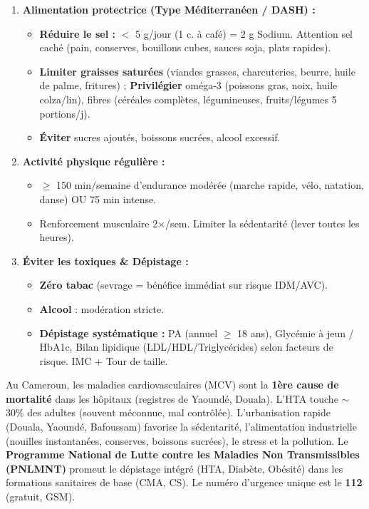 \documentclass[11pt]{article}
\begin{document}
\begin{methode}
\begin{enumerate}
    \item \textbf{Alimentation protectrice (Type Méditerranéen / DASH) :}
    \begin{itemize}
        \item \textbf{Réduire le sel :} $<$ 5 g/jour (1 c. à café) = 2 g Sodium. Attention sel caché (pain, conserves, bouillons cubes, sauces soja, plats rapides).
        \item \textbf{Limiter graisses saturées} (viandes grasses, charcuteries, beurre, huile de palme, fritures) ; \textbf{Privilégier} oméga-3 (poissons gras, noix, huile colza/lin), fibres (céréales complètes, légumineuses, fruits/légumes 5 portions/j).
        \item \textbf{Éviter} sucres ajoutés, boissons sucrées, alcool excessif.
    \end{itemize}
    \item \textbf{Activité physique régulière :}
    \begin{itemize}
        \item $\ge$ 150 min/semaine d'endurance modérée (marche rapide, vélo, natation, danse) OU 75 min intense.
        \item Renforcement musculaire 2$\times$/sem. Limiter la sédentarité (lever toutes les heures).
    \end{itemize}
    \item \textbf{Éviter les toxiques \& Dépistage :}
    \begin{itemize}
        \item \textbf{Zéro tabac} (sevrage = bénéfice immédiat sur risque IDM/AVC).
        \item \textbf{Alcool} : modération stricte.
        \item \textbf{Dépistage systématique :} PA (annuel $\ge$ 18 ans), Glycémie à jeun / HbA1c, Bilan lipidique (LDL/HDL/Triglycérides) selon facteurs de risque. IMC + Tour de taille.
    \end{itemize}
\end{enumerate}
\end{methode}

\begin{savaistu}
Au Cameroun, les maladies cardiovasculaires (MCV) sont la \textbf{1ère cause de mortalité} dans les hôpitaux (registres de Yaoundé, Douala). L'HTA touche $\sim$ 30\% des adultes (souvent méconnue, mal contrôlée). L'urbanisation rapide (Douala, Yaoundé, Bafoussam) favorise la sédentarité, l'alimentation industrielle (nouilles instantanées, conserves, boissons sucrées), le stress et la pollution. Le \textbf{Programme National de Lutte contre les Maladies Non Transmissibles (PNLMNT)} promeut le dépistage intégré (HTA, Diabète, Obésité) dans les formations sanitaires de base (CMA, CS). Le numéro d'urgence unique est le \textbf{112} (gratuit, GSM).
\end{savaistu}
\end{document}
